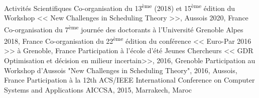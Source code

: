 \begin{rubric}{Activités Scientifiques}
    \entry*[]	Co-organisation du 13\textsuperscript{ème} (2018) et 15\textsuperscript{ème} édition du Workshop << New Challenges in Scheduling Theory >>, Aussois 2020, France 
    \entry*[]	Co-organisation du 7\textsuperscript{ème}  journée des doctorants à l'Université Grenoble Alpes 2018, France 
\entry*[]	Co-organisation du 22\textsuperscript{ème} édition du conférence << Euro-Par 2016 >> à Grenoble, France 
\entry*[]	Participation à l'école d'été Jeunes Chercheurs << GDR Optimisation et décision en milieur incertain>>, 2016, Grenoble 	
\entry*[]	Participation au Workshop d'Aussois "New Challenges in Scheduling Theory", 2016, Aussois, France	
\entry*[]	Participation à la 12th ACS/IEEE International Conference on Computer Systems and Applications AICCSA, 2015, Marrakech, Maroc 	
\end{rubric}
